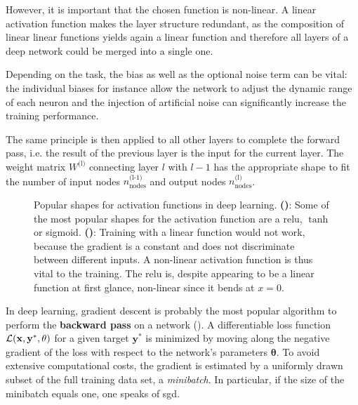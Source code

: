 However, it is important that the chosen function is non-linear. A linear activation function makes the layer structure redundant, as the composition of linear linear functions yields again a linear function and therefore all layers of a deep network could be merged into a single one.

Depending on the task, the bias as well as the optional noise term can be vital: the individual biases for instance allow the network to adjust the dynamic range of each neuron and the injection of artificial noise can significantly increase the training performance.

The same principle is then applied to all other layers to complete the forward pass, i.e. the result of the previous layer is the input for the current layer. The weight matrix $W^{\text{(l)}}$ connecting layer $l$ with $l-1$ has the appropriate shape to fit the number of input nodes $n^{\text{(l-1)}}_\text{nodes}$ and output nodes $n^{\text{(l)}}_\text{nodes}$.

\begin{figure}
	\begin{subfigure}[c]{0.5\textwidth}
		\centering
		\caption{}
		\label{dltransfer}
	\end{subfigure}
	\begin{subfigure}[c]{0.5\textwidth}
		\centering
		\caption{}
		\label{dltransfergradient}
	\end{subfigure}
	\caption[Popular shapes for activation functions in deep learning.]{Popular shapes for activation functions in deep learning. \textbf{()}: Some of the most popular shapes for the activation function are a \gls{relu}, $\tanh$ or sigmoid. \textbf{()}: Training with a linear function would not work, because the gradient is a constant and does not discriminate between different inputs. A non-linear activation function is thus vital to the training. The \gls{relu} is, despite appearing to be a linear function at first glance, non-linear since it bends at $x=0$.}
	\label{deeplearning_activation_functions}
\end{figure}

In deep learning, gradient descent is probably the most popular algorithm to perform the \textbf{backward pass} on a network (\citealp{Goodfellow-et-al-2016}). A differentiable loss function $\mathcal{L}(\mathbf{\mathbf{x}, y^*, \theta})$ for a given target $\textbf{y}^*$ is minimized by moving along the negative gradient of the loss with respect to the network's parameters $\mathbf{\theta}$. To avoid extensive computational costs, the gradient is estimated by a uniformly drawn subset of the full training data set, a \emph{minibatch}. In particular, if the size of the minibatch equals one, one speaks of \gls{sgd}.

